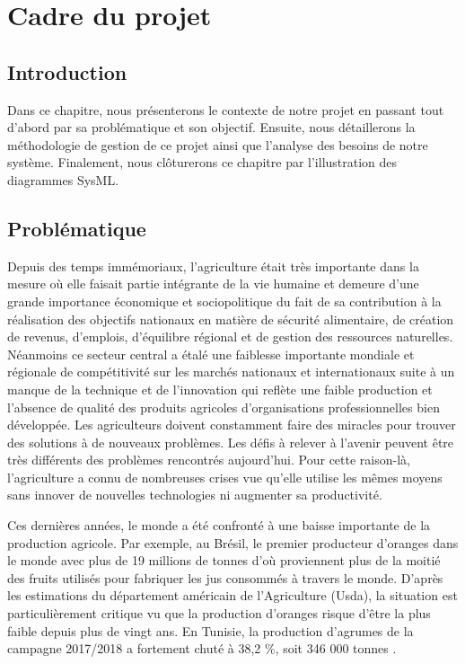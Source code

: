 
\chapter{ Cadre du projet }
\clearpage
\section*{Introduction }
Dans ce chapitre, nous présenterons le contexte de notre projet en passant tout d'abord par sa  problématique et son objectif. Ensuite, nous détaillerons la méthodologie de gestion de ce projet ainsi que l'analyse des besoins de notre système. Finalement, nous clôturerons ce chapitre par l'illustration des diagrammes SysML.

\section{Problématique }
Depuis des temps immémoriaux, l'agriculture était très importante dans la mesure où elle faisait partie intégrante de la vie humaine et demeure d'une grande importance économique et sociopolitique du fait de sa contribution à la réalisation des objectifs nationaux en matière de sécurité alimentaire, de création de revenus, d'emplois, d'équilibre régional et de gestion des ressources naturelles. Néanmoins ce secteur central a étalé une faiblesse importante mondiale et régionale de compétitivité sur les marchés nationaux et internationaux suite à un manque de la technique et de l'innovation qui reflète une faible production et l'absence de qualité des produits agricoles d'organisations professionnelles bien développée. Les agriculteurs doivent constamment faire des miracles pour trouver des solutions à de nouveaux problèmes. Les défis à relever à l'avenir peuvent être très différents des problèmes rencontrés aujourd'hui. Pour cette raison-là, l'agriculture a connu de nombreuses crises vue qu'elle utilise les mêmes moyens sans innover de nouvelles technologies ni augmenter sa productivité.

Ces dernières années, le monde a été confronté à une baisse importante de la production agricole. Par exemple, au Brésil, le premier producteur d'oranges dans le monde avec plus de 19 millions de tonnes d'où proviennent plus de la moitié des fruits utilisés pour fabriquer les jus consommés à travers le monde. D'après les estimations du département américain de l'Agriculture (Usda), la situation est particulièrement critique vu que la production d'oranges risque d'être la plus faible depuis plus de vingt ans. En Tunisie, la production d'agrumes de la campagne 2017/2018 a fortement chuté à 38,2 \%, soit 346 000 tonnes \cite{onagri2017/2018}.

